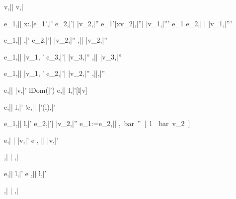 


  {}
  {v,\bar{\sigma}\bar{\eval} v,\bar{\sigma}}


  {e_1,\bar{\sigma}\bar{\eval} \lambda x:\tau.\bar{e_1'},\bar{\sigma'}\Quad
   e_2,\bar{\sigma'}\bar{\eval} \bar{v_2},\bar{\sigma''}\Quad
   e_1'[x\mapsto v_2],\bar{\sigma''}\bar{\eval} \bar{v_1},\bar{\sigma'''}}
  {e_1 e_2,\bar{\sigma} \bar{\eval} \bar{v_1},\bar{\sigma'''}}


  {e_1,\bar{\sigma}\bar{\eval} \True,\bar{\sigma'}\Quad
   e_2,\bar{\sigma'}\bar{\eval} \bar{v_2},\bar{\sigma''}}
  {,\bar{\sigma}\bar{\eval} \bar{v_2},\bar{\sigma''}}

  {e_1,\bar{\sigma}\bar{\eval} \bar{v_1},\bar{\sigma'} \Quad
   e_3,\bar{\sigma'}\bar{\eval} \bar{v_3},\bar{\sigma''}}
  {,\bar{\sigma}\bar{\eval} \bar{v_3},\bar{\sigma''}}


  {e_1,\bar{\sigma}\bar{\eval} \bar{v_1},\bar{\sigma'} \Quad
   e_2,\bar{\sigma'}\bar{\eval} \bar{v_2},\bar{\sigma''}}
  {,\bar{\sigma}\bar{\eval},\bar{\sigma''}}


  {e,\bar{\sigma}\bar{\eval} \bar{v},\bar{\sigma'} \Quad
   l\not\in Dom(\bar{\sigma'})}
  {\Ref e,\bar{\sigma}\bar{\eval} l,\bar{\sigma'}[l\mapsto \bar{v}]}

  {e,\bar{\sigma}\bar{\eval} l,\bar{\sigma'}}
  {!e,\bar{\sigma}\bar{\eval} \bar{\sigma'}(l),\bar{\sigma'}}

  {e_1,\bar{\sigma}\bar{\eval} l,\bar{\sigma'} \Quad
   e_2,\bar{\sigma'}\bar{\eval} \bar{v_2},\bar{\sigma''}}
  {e_1:=e_2,\bar{\sigma}\bar{\eval} \unit,\bar{\sigma''}[l\mapsto \bar{v_2}]}

  {e,\bar{\sigma} \bar{\eval} \bar{v},\bar{\sigma'}}
  {\Edit e , \bar{\sigma}\bar{\eval} \Edit \bar{v},\bar{\sigma'}}

  {}
  {\Enter \tau,\bar{\sigma} \bar{\eval} \Enter \tau,\bar{\sigma}}

  {e,\bar{\sigma}\bar{\eval} l,\bar{\sigma'}}
  {\Update e ,\bar{\sigma}\bar{\eval} \Update l,\bar{\sigma'}}


  {}
  {\Fail,\bar{\sigma} \bar{\eval} \Fail,\bar{\sigma}}



